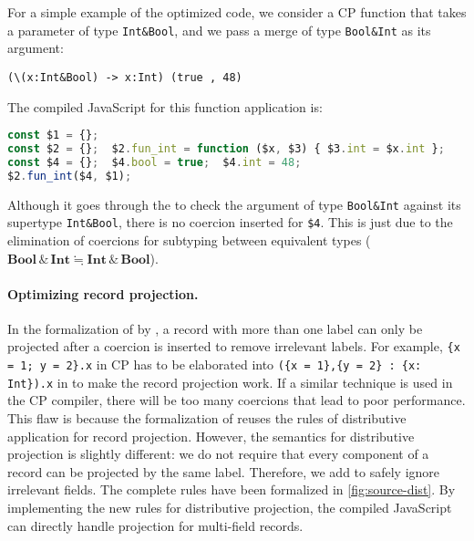 For a simple example of the optimized code, we consider a CP function that takes
a parameter of type \lstinline{Int&Bool}, and we pass a merge of type
\lstinline{Bool&Int} as its argument:
\begin{lstlisting}
(\(x:Int&Bool) -> x:Int) (true , 48)
\end{lstlisting}
The compiled JavaScript for this function application is:
\begin{lstlisting}[language=TypeScript]
const $1 = {};
const $2 = {};  $2.fun_int = function ($x, $3) { $3.int = $x.int };
const $4 = {};  $4.bool = true;  $4.int = 48;
$2.fun_int($4, $1);
\end{lstlisting}
Although it goes through the  to check the argument of type
\lstinline{Bool&Int} against its supertype \lstinline{Int&Bool}, there is no
coercion inserted for \lstinline{$4}. This is just due to the elimination of
coercions for subtyping between equivalent types ($ \mathbf{Bool}   \, {\&} \,   \mathbf{Int}   \fallingdotseq   \mathbf{Int}   \, {\&} \,   \mathbf{Bool} $).


\paragraph{Optimizing record projection.} \label{sec:proj}
In the formalization of \fiplus by \citet{fan2022direct}, a record with more
than one label can only be projected after a coercion is inserted to remove
irrelevant labels. For example, \lstinline|{x = 1; y = 2}.x| in CP has to be
elaborated into \lstinline|({x = 1},{y = 2} : {x: Int}).x| in \fiplus to make
the record projection work. If a similar technique is used in the CP compiler,
there will be too many coercions that lead to poor performance. This flaw is
because the formalization of \fiplus reuses the rules of distributive
application for record projection. However, the semantics for distributive
projection is slightly different: we do not require that every component of a
record can be projected by the same label. Therefore, we add  to
safely ignore irrelevant fields. The complete rules have been formalized in
\autoref{fig:source-dist}. By implementing the new rules for distributive
projection, the compiled JavaScript can directly handle projection for
multi-field records.

